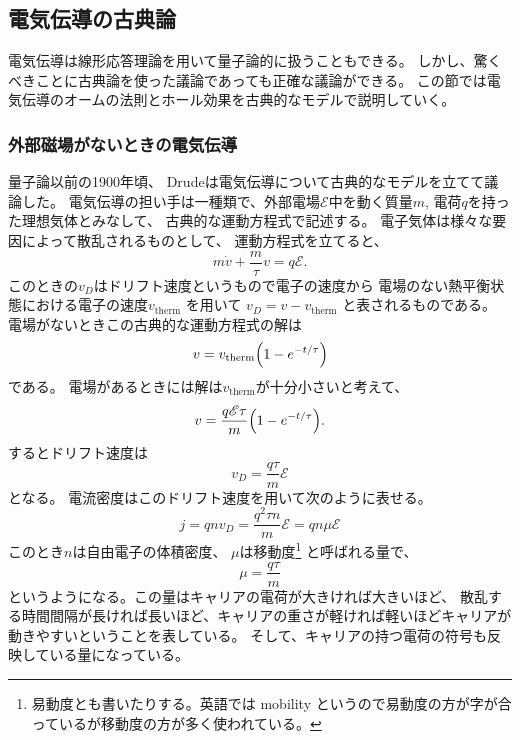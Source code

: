 \documentclass[11pt,dvipdfmx,a4paper]{jsarticle}
\numberwithin{equation}{section}
\begin{document}
\subsection*{電気伝導の古典論}
電気伝導は線形応答理論を用いて量子論的に扱うこともできる。
しかし、驚くべきことに古典論を使った議論であっても正確な議論ができる。
この節では電気伝導のオームの法則とホール効果を古典的なモデルで説明していく。
\subsubsection*{外部磁場がないときの電気伝導}
量子論以前の1900年頃、
Drudeは電気伝導について古典的なモデルを立てて議論した。
電気伝導の担い手は一種類で、外部電場\(\mathscr{E}\)中を動く質量\(m\), 電荷\(q\)を持った理想気体とみなして、
古典的な運動方程式で記述する。
電子気体は様々な要因によって散乱されるものとして、
運動方程式を立てると、
\begin{equation}
    m\dot{v} + \frac{m}{\tau}v= q\mathscr{E}.
\end{equation}
このときの\(v_D\)はドリフト速度というもので電子の速度から
電場のない熱平衡状態における電子の速度\(v_{\text{therm}}\)
を用いて
\(
    v_D= v-v_{\text{therm}}
\)
と表されるものである。
電場がないときこの古典的な運動方程式の解は
\begin{equation}
    v = v_{\text{therm}}\qty(1-e^{-t/\tau})
\end{equation}
である。
電場があるときには解は\(v_{\text{therm}}\)が十分小さいと考えて、
\begin{equation}
    v = \frac{q\mathscr{E}\tau}{m}\qty(1-e^{-t/\tau}).
\end{equation}
するとドリフト速度は
\begin{equation}
    v_D=\frac{q\tau}{m}\mathscr{E}
\end{equation}
となる。
電流密度はこのドリフト速度を用いて次のように表せる。
\begin{equation}
    j = qnv_D = \frac{q^2\tau n}{m}\mathscr{E} = qn\mu\mathscr{E}
\end{equation}
このとき\(n\)は自由電子の体積密度、
\(\mu\)は移動度\footnote{易動度とも書いたりする。英語では mobility というので易動度の方が字が合っているが移動度の方が多く使われている。}
と呼ばれる量で、
\begin{equation}
	\mu = \frac{q\tau}{m}
\end{equation}
というようになる。この量はキャリアの電荷が大きければ大きいほど、
散乱する時間間隔が長ければ長いほど、キャリアの重さが軽ければ軽いほどキャリアが動きやすいということを表している。
そして、キャリアの持つ電荷の符号も反映している量になっている。
\end{document}
